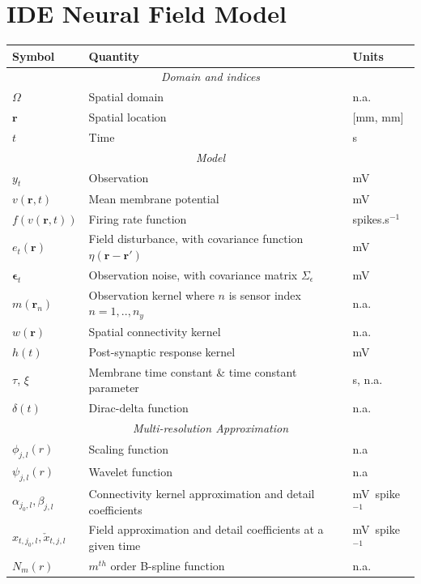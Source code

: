 \documentclass[review,authoryear,3p]{elsarticle}
\begin{document}
\section{IDE Neural Field Model}
\singlespacing
\begin{table}[!t]
\begin{tabular}{|l|l|l|}
	\hline
	\textbf{Symbol} & \textbf{Quantity} & \textbf{Units}\\
	\hline
	\multicolumn{3}{|c|}{\emph{Domain and indices}}\\
	\hline
	$\Omega$ & Spatial domain & n.a.\\
	$\mathbf{r}$ & Spatial location & [mm, mm]\\
	$t$ & Time & s\\
	\hline
	\multicolumn{3}{|c|}{\emph{Model}}\\
	\hline
    $y_t$ & Observation & mV\\
    $v(\mathbf{r},t)$ & Mean membrane potential & mV \\
	$f(v\left(\mathbf{r},t\right))$ & Firing rate function & spikes.s$^{-1}$\\
	$e_t(\mathbf{r})$ & Field disturbance, with covariance function $\eta(\mathbf r-\mathbf r')$ & mV\\
	$\boldsymbol\epsilon_t$ & Observation noise, with covariance matrix $\Sigma_\epsilon$ & mV\\
	$m(\mathbf{r}_n)$ & Observation kernel where $n$ is sensor index $n=1,..,n_y$ & n.a. \\
	$w(\mathbf{r})$ & Spatial connectivity kernel & n.a.\\
	$h(t)$ & Post-synaptic response kernel & mV\\
	$\tau$, $\xi$ & Membrane time constant \& time constant parameter & s, n.a.\\
	$\delta(t)$ & Dirac-delta function & n.a.\\
	\hline    
	\multicolumn{3}{|c|}{\emph{Multi-resolution Approximation}} \\
	\hline                                                   
	$\phi_{j,l}(r)$&Scaling function&n.a\\
	$\psi_{j,l}(r)$&Wavelet function&n.a\\  
	$\alpha_{j_0,l}, \beta_{j,l}$&Connectivity kernel approximation and detail coefficients&mV~spike$^{-1}$\\ 
	$x_{t,j_{0},l},\check{x}_{t,j,l}$&Field approximation and detail coefficients at a given time&mV~spike$^{-1}$\\ 
	$N_m(r)$&$m^{th}$ order B-spline function&n.a.\\

\end{tabular}
\end{table}
\end{document}
